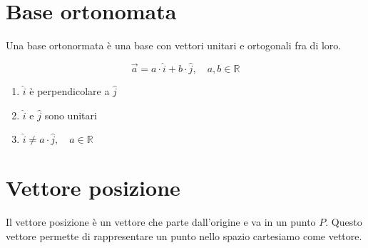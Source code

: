 \documentclass{article}
\begin{document}
\section{Base ortonomata}

Una base ortonormata è una base con vettori unitari e ortogonali fra di loro.

\[
    \vec{a} = a \cdot \hat{i} + b \cdot \hat{j},
    \quad a,b \in \mathbb{R}
\]

\begin{enumerate}
    \item \(\hat{i}\) è perpendicolare a \(\hat{j}\)
    \item \(\hat{i}\) e \(\hat{j}\) sono unitari
    \item \(\hat{i} \neq a\cdot\hat{j},\quad a\in \mathbb{R}\)  
\end{enumerate}

\section{Vettore posizione}

Il vettore posizione è un vettore che parte dall'origine e va in un punto \(P\).
Questo vettore permette di rappresentare un punto nello spazio cartesiamo come vettore.

\pagebreak
\end{document}
